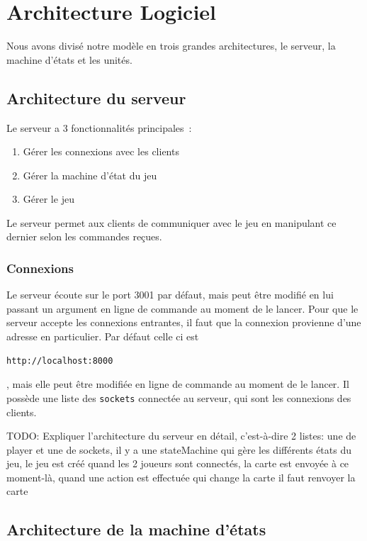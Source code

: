 
\section{Architecture Logiciel}

Nous avons divisé notre modèle en trois grandes architectures, le serveur, la machine d'états et les unités.

\subsection{Architecture du serveur}

Le serveur a 3 fonctionnalités principales :
\begin{enumerate}
    \item Gérer les connexions avec les clients
    \item Gérer la machine d'état du jeu
    \item Gérer le jeu
\end{enumerate}

Le serveur permet aux clients de communiquer avec le jeu en manipulant ce dernier selon les commandes reçues.

\subsubsection{Connexions}

Le serveur écoute sur le port 3001 par défaut, mais peut être modifié en lui passant un argument en ligne de commande au moment de le lancer.
Pour que le serveur accepte les connexions entrantes, il faut que la connexion provienne d'une adresse en particulier. Par défaut celle ci est \begin{verbatim}http://localhost:8000\end{verbatim}, mais elle peut être modifiée en ligne de commande au moment de le lancer.
Il possède une liste des {\tt sockets} connectée au serveur, qui sont les connexions des clients.

TODO: Expliquer l'architecture du serveur en détail, c'est-à-dire 2 listes: une de player et une de sockets, il y a une stateMachine qui gère les différents états du jeu,
le jeu est créé quand les 2 joueurs sont connectés, la carte est envoyée à  ce moment-là, quand une action est effectuée qui change la carte il faut renvoyer la carte

\subsection{Architecture de la machine d'états}



